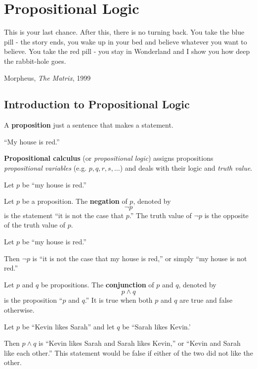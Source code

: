 \chapter{Propositional Logic}
\epigraph{This is your last chance. After this, there is no turning back. You
take the blue pill - the story ends, you wake up in your bed and believe
whatever you want to believe. You take the red pill - you stay in Wonderland and
I show you how deep the rabbit-hole goes.}{Morpheus, \emph{The Matrix}, 1999}

\section{Introduction to Propositional Logic}

  A \textbf{proposition} just a sentence that makes a statement.
  \begin{ex}
    ``My house is red.''
  \end{ex}

  \textbf{Propositional calculus} (or \emph{propositional logic}) assigns propositions \emph{propositional variables}
  (e.g. \(p, q, r, s, \ldots\)) and deals with their logic and \emph{truth value}.
  \begin{ex}
    Let $p$ be ``my house is red.''
  \end{ex}

  Let \(p\) be a proposition. The \textbf{negation} of \(p\), denoted by \[\neg p\] is the statement
  ``it is not the case that \(p\).''
  The truth value of \(\neg p\) is the opposite of the truth value of \(p\).
  \begin{ex}
    Let $p$ be ``my house is red.''

    Then $\neg p$ is ``it is not the case that my house is red,'' or simply ``my house is not red.''
  \end{ex}

  Let \(p\) and \(q\) be propositions. The \textbf{conjunction} of \(p\) and \(q\), denoted by \[ p \wedge q \] is the proposition
  ``\(p\) and \(q\).'' It is true when both \(p\) and \(q\) are true and false otherwise.
  \begin{ex}
    Let $p$ be ``Kevin likes Sarah'' and let $q$ be ``Sarah likes Kevin.'

    Then $p \wedge q$ is ``Kevin likes Sarah and Sarah likes Kevin,'' or ``Kevin and Sarah like each other.''
    This statement would be false if either of the two did not like the other.
  \end{ex}


